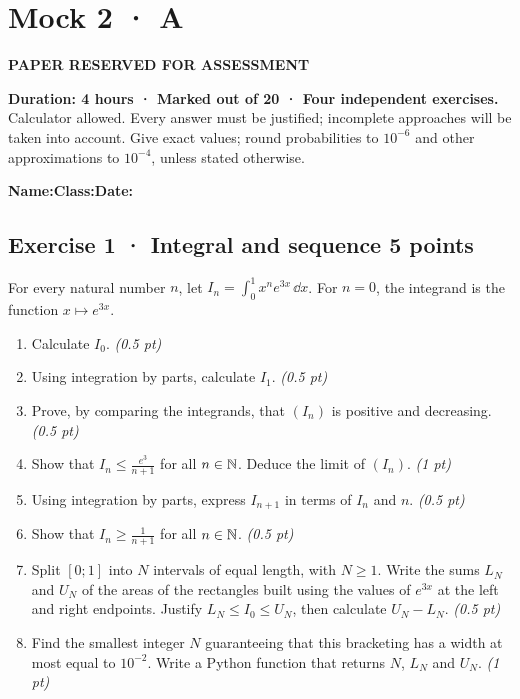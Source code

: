 \fi

\ifprof

\clearpage{}\label{sujet:8-3}

\section*{Mock 2 · A}

{\sffamily\bfseries\color{amber}PAPER RESERVED FOR ASSESSMENT\par}

\textbf{Duration: 4 hours · Marked out of 20 · Four independent exercises.}\\Calculator allowed. Every answer must be justified; incomplete approaches will be taken into account. Give exact values; round probabilities to $10^{-6}$ and other approximations to $10^{-4}$, unless stated otherwise.

\smallskip\textbf{Name:}\enspace\dotfill\quad\textbf{Class:}\enspace\dotfill\quad\textbf{Date:}\enspace\dotfill

\subsection*{Exercise 1 · Integral and sequence \hfill 5 points}For every natural number $n$, let $I_n=\displaystyle\int_0^1x^ne^{3x}\,\dd x$. For $n=0$, the integrand is the function $x\mapsto e^{3x}$.

\begin{enumerate}

\item Calculate $I_0$. \hfill\textit{(0.5 pt)}

\item Using integration by parts, calculate $I_1$. \hfill\textit{(0.5 pt)}

\item Prove, by comparing the integrands, that $(I_n)$ is positive and decreasing. \hfill\textit{(0.5 pt)}

\item Show that $I_n\le\frac{e^{3}}{n+1}$ for all $n\in\mathbb N$. Deduce the limit of $(I_n)$. \hfill\textit{(1 pt)}

\item Using integration by parts, express $I_{n+1}$ in terms of $I_n$ and $n$. \hfill\textit{(0.5 pt)}

\item Show that $I_n\ge\frac1{n+1}$ for all $n\in\mathbb N$. \hfill\textit{(0.5 pt)}

\item Split $[0;1]$ into $N$ intervals of equal length, with $N\ge1$. Write the sums $L_N$ and $U_N$ of the areas of the rectangles built using the values of $e^{3x}$ at the left and right endpoints. Justify $L_N\le I_0\le U_N$, then calculate $U_N-L_N$. \hfill\textit{(0.5 pt)}

\item Find the smallest integer $N$ guaranteeing that this bracketing has a width at most equal to $10^{-2}$. Write a Python function that returns $N$, $L_N$ and $U_N$. \hfill\textit{(1 pt)}

\end{enumerate}

